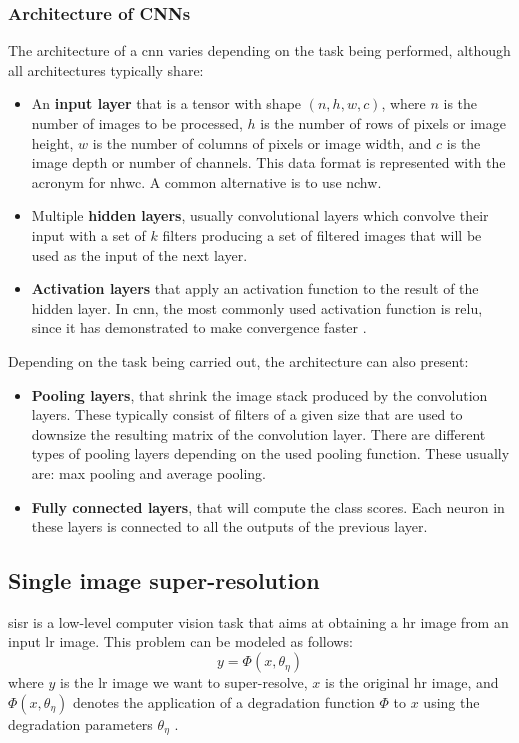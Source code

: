 \subsubsection*{Architecture of CNNs}
The architecture of a \gls{cnn} varies depending on the task being performed, although all architectures typically share:
\begin{itemize}
	\item An \textbf{input layer} that is a tensor with shape 
	$(n, h, w, c)$, where $n$ is the number of images to be processed, $h$ is the number of rows of pixels or image height, $w$ is the number of columns of pixels or image width, and $c$ is the image depth or number of channels. This data format is represented with the acronym for \gls{nhwc}. A common alternative is to use \gls{nchw}.
	\item Multiple \textbf{hidden layers}, usually convolutional layers which convolve their input with a set of $k$ filters producing a set of filtered images that will be used as the input of the next layer.
	\item \textbf{Activation layers} that apply an activation function to the result of the hidden layer. In \gls{cnn}, the most commonly used activation function is \gls{relu}, since it has demonstrated to make convergence faster \cite{RELU}.
\end{itemize}

Depending on the task being carried out, the architecture can also present:
\begin{itemize}
	\item \textbf{Pooling layers}, that shrink the image stack produced by the convolution layers. These typically consist of filters of a given size that are used to downsize the resulting matrix of the convolution layer. There are different types of pooling layers depending on the used pooling function. These usually are: max pooling and average pooling.
	\item \textbf{Fully connected layers}, that will compute the class scores. Each neuron in these layers is connected to all the outputs of the previous layer.
\end{itemize}

\subsection{Single image super-resolution}

\gls{sisr} is a low-level computer vision task that aims at obtaining a \gls{hr} image from an input \gls{lr} image. This problem can be modeled as follows:
$$y = \Phi(x, \theta_\eta)$$
where $y$ is the \gls{lr} image we want to super-resolve, $x$ is the original \gls{hr} image, and $\Phi(x, \theta_\eta)$ denotes the application of a degradation function $\Phi$ to $x$ using the degradation parameters $\theta_\eta$ \cite{DBLP:SISR}. 

